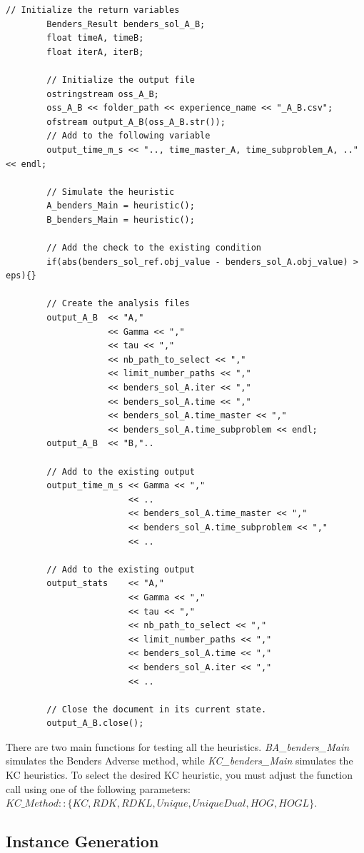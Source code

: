 \documentclass[12pt, a4paper, twoside]{article}
\numberwithin{equation}{section}
\begin{document}
	\begin{lstlisting}[caption={Add a comparison between two methods.}, label={lst:ajout_comparaison}]
		// Initialize the return variables
		Benders_Result benders_sol_A_B;
		float timeA, timeB;
		float iterA, iterB;
		
		// Initialize the output file
		ostringstream oss_A_B;
		oss_A_B << folder_path << experience_name << "_A_B.csv";
		ofstream output_A_B(oss_A_B.str());
		// Add to the following variable
		output_time_m_s << ".., time_master_A, time_subproblem_A, .." << endl;
		
		// Simulate the heuristic
		A_benders_Main = heuristic();
		B_benders_Main = heuristic();
	
		// Add the check to the existing condition
		if(abs(benders_sol_ref.obj_value - benders_sol_A.obj_value) > eps){}
		
		// Create the analysis files
		output_A_B	<< "A,"
					<< Gamma << ","
					<< tau << ","
					<< nb_path_to_select << ","
					<< limit_number_paths << ","
					<< benders_sol_A.iter << ","
					<< benders_sol_A.time << ","
					<< benders_sol_A.time_master << ","
					<< benders_sol_A.time_subproblem << endl;
		output_A_B	<< "B,"..
	
		// Add to the existing output
		output_time_m_s	<< Gamma << ","
						<< ..
						<< benders_sol_A.time_master << ","
						<< benders_sol_A.time_subproblem << ","
						<< ..
		
		// Add to the existing output
		output_stats 	<< "A,"
						<< Gamma << ","
						<< tau << ","
						<< nb_path_to_select << ","
						<< limit_number_paths << ","
						<< benders_sol_A.time << ","
						<< benders_sol_A.iter << ","
						<< ..
		
		// Close the document in its current state.
		output_A_B.close();
	\end{lstlisting}

	\noindent There are two main functions for testing all the heuristics. \textit{BA\_benders\_Main} simulates the Benders Adverse method, while \textit{KC\_benders\_Main} simulates the KC heuristics. To select the desired KC heuristic, you must adjust the function call using one of the following parameters: $KC\_Method::\{KC, RDK, RDKL, Unique, UniqueDual, HOG, HOGL\}$.
	
	\subsection{Instance Generation}
	
\end{document}
